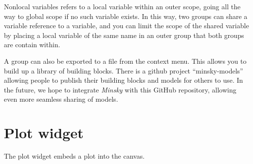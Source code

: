 Nonlocal variables refers to a local variable within an outer scope,
going all the way to global scope if no such variable exists. In this
way, two groups can share a variable reference to a variable, and
you can limit the scope of the shared variable by placing a local
variable of the same name in an outer group that both groups are contain
within.

A group can also be exported to a file from the context menu. This
allows you to build up a library of building blocks. There is a github
project ``minsky-models'' allowing people to publish their building
blocks and models for others to use. In the future, we hope to integrate
\emph{Minsky} with this GitHub repository, allowing even more seamless
sharing of models.

\section{Plot widget}

\label{PlotWidget}


The plot widget embeds a plot into the canvas.


